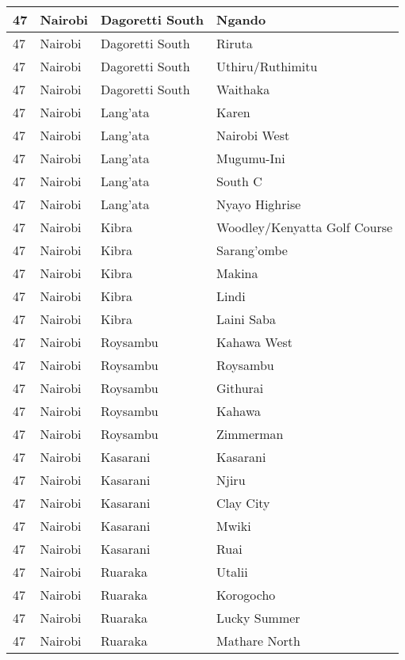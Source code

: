 \begin{table}[!ht]
\begin{tabular}{|l|l|l|l|}
        47 & Nairobi & Dagoretti South & Ngando \\ \hline
        47 & Nairobi & Dagoretti South & Riruta \\ \hline
        47 & Nairobi & Dagoretti South & Uthiru/Ruthimitu \\ \hline
        47 & Nairobi & Dagoretti South & Waithaka \\ \hline
        47 & Nairobi & Lang’ata & Karen \\ \hline
        47 & Nairobi & Lang’ata & Nairobi West \\ \hline
        47 & Nairobi & Lang’ata & Mugumu-Ini \\ \hline
        47 & Nairobi & Lang’ata & South C \\ \hline
        47 & Nairobi & Lang’ata & Nyayo Highrise \\ \hline
        47 & Nairobi & Kibra & Woodley/Kenyatta Golf Course \\ \hline
        47 & Nairobi & Kibra & Sarang’ombe \\ \hline
        47 & Nairobi & Kibra & Makina \\ \hline
        47 & Nairobi & Kibra & Lindi \\ \hline
        47 & Nairobi & Kibra & Laini Saba \\ \hline
        47 & Nairobi & Roysambu & Kahawa West \\ \hline
        47 & Nairobi & Roysambu & Roysambu \\ \hline
        47 & Nairobi & Roysambu & Githurai \\ \hline
        47 & Nairobi & Roysambu & Kahawa \\ \hline
        47 & Nairobi & Roysambu & Zimmerman \\ \hline
        47 & Nairobi & Kasarani & Kasarani \\ \hline
        47 & Nairobi & Kasarani & Njiru \\ \hline
        47 & Nairobi & Kasarani & Clay City \\ \hline
        47 & Nairobi & Kasarani & Mwiki \\ \hline
        47 & Nairobi & Kasarani & Ruai \\ \hline
        47 & Nairobi & Ruaraka & Utalii \\ \hline
        47 & Nairobi & Ruaraka & Korogocho \\ \hline
        47 & Nairobi & Ruaraka & Lucky Summer \\ \hline
        47 & Nairobi & Ruaraka & Mathare North \\ \hline

\end{tabular}
\end{table}

